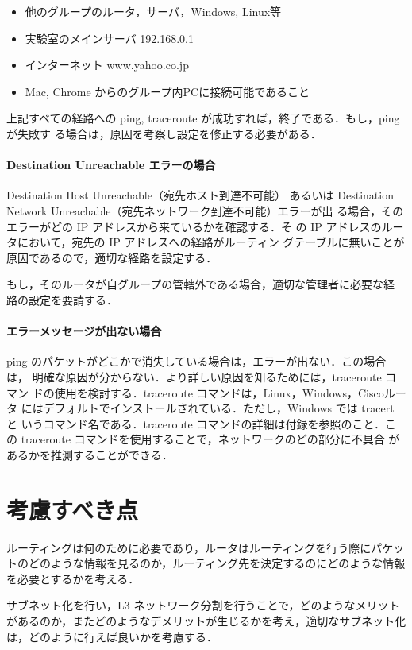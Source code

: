 \begin{itemize}
  \item 他のグループのルータ，サーバ，Windows, Linux等
  \item 実験室のメインサーバ 192.168.0.1
  \item インターネット www.yahoo.co.jp
  \item Mac, Chrome からのグループ内PCに接続可能であること
\end{itemize}

上記すべての経路への ping, traceroute が成功すれば，終了である．もし，ping が失敗す
る場合は，原因を考察し設定を修正する必要がある．

\paragraph{Destination Unreachable エラーの場合}

Destination Host Unreachable（宛先ホスト到達不可能） あるいは
Destination Network Unreachable（宛先ネットワーク到達不可能）エラーが出
る場合，そのエラーがどの IP アドレスから来ているかを確認する．そ
の IP アドレスのルータにおいて，宛先の IP アドレスへの経路がルーティン
グテーブルに無いことが原因であるので，適切な経路を設定する．

もし，そのルータが自グループの管轄外である場合，適切な管理者に必要な経
路の設定を要請する．

\paragraph{エラーメッセージが出ない場合}

ping のパケットがどこかで消失している場合は，エラーが出ない．この場合は，
明確な原因が分からない．より詳しい原因を知るためには，traceroute コマン
ドの使用を検討する．traceroute コマンドは，Linux，Windows，Ciscoルータ
にはデフォルトでインストールされている．ただし，Windows では tracert と
いうコマンド名である．traceroute コマンドの詳細は付録を参照のこと．こ
の traceroute コマンドを使用することで，ネットワークのどの部分に不具合
があるかを推測することができる．

\section{考慮すべき点}
ルーティングは何のために必要であり，ルータはルーティングを行う際にパケットのどのような情報を見るのか，ルーティング先を決定するのにどのような情報を必要とするかを考える．

サブネット化を行い，L3 ネットワーク分割を行うことで，どのようなメリット
があるのか，またどのようなデメリットが生じるかを考え，適切なサブネット化
は，どのように行えば良いかを考慮する．

\clearpage